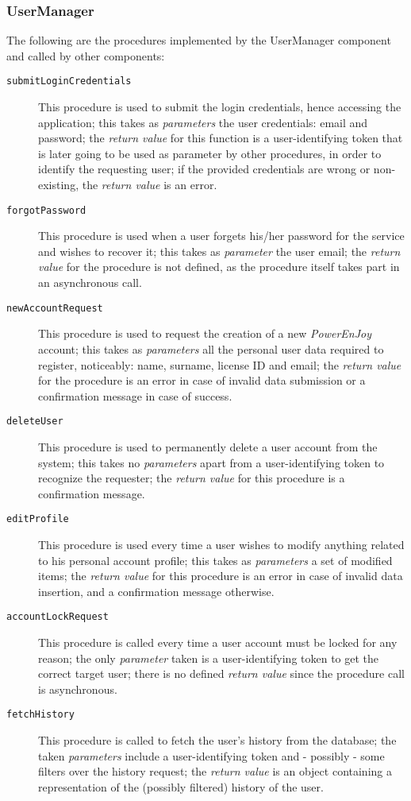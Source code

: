 \subsubsection{UserManager}
The following are the procedures implemented by the UserManager component and called by other components:
\begin{description}
\item[\texttt{submitLoginCredentials}] This procedure is used to submit the login credentials, hence accessing the application; this takes as \textit{parameters} the user credentials: email and password; the \textit{return value} for this function is a user-identifying token that is later going to be used as parameter by other procedures, in order to identify the requesting user; if the provided credentials are wrong or non-existing, the \textit{return value} is an error.
\item[\texttt{forgotPassword}] This procedure is used when a user forgets his/her password for the service and wishes to recover it; this takes as \textit{parameter} the user email; the \textit{return value} for the procedure is not defined, as the procedure itself takes part in an asynchronous call.
\item[\texttt{newAccountRequest}] This procedure is used to request the creation of a new \textit{PowerEnJoy} account; this takes as \textit{parameters} all the personal user data required to register, noticeably: name, surname, license ID and email; the \textit{return value} for the procedure is an error in case of invalid data submission or a confirmation message in case of success.
\item[\texttt{deleteUser}] This procedure is used to permanently delete a user account from the system; this takes no \textit{parameters} apart from a user-identifying token to recognize the requester; the \textit{return value} for this procedure is a confirmation message.
\item[\texttt{editProfile}] This procedure is used every time a user wishes to modify anything related to his personal account profile; this takes as \textit{parameters} a set of modified items; the \textit{return value} for this procedure is an error in case of invalid data insertion, and a confirmation message otherwise.
\item[\texttt{accountLockRequest}] This procedure is called every time a user account must be locked for any reason; the only \textit{parameter} taken is a user-identifying token to get the correct target user; there is no defined \textit{return value} since the procedure call is asynchronous.
\item[\texttt{fetchHistory}] This procedure is called to fetch the user's history from the database; the taken \textit{parameters} include a user-identifying token and - possibly - some filters over the history request; the \textit{return value} is an object containing a representation of the (possibly filtered) history of the user.
\end{description}
